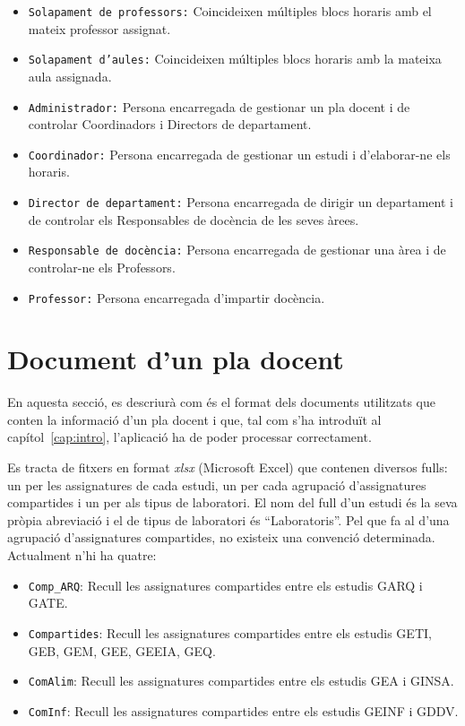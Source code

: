 \documentclass[a4paper,12pt]{ThesisStyle}
\begin{document}
\begin{itemize}
  \item \texttt{Solapament de professors:} Coincideixen múltiples blocs horaris amb el mateix professor assignat.
  \item \texttt{Solapament d'aules:} Coincideixen múltiples blocs horaris amb la mateixa aula assignada.
  \item \texttt{Administrador:} Persona encarregada de gestionar un pla docent i de controlar Coordinadors i Directors de departament.
  \item \texttt{Coordinador:} Persona encarregada de gestionar un estudi i d'elaborar-ne els horaris.
  \item \texttt{Director de departament:} Persona encarregada de dirigir un departament i de controlar els Responsables de docència de les seves àrees.
  \item \texttt{Responsable de docència:} Persona encarregada de gestionar una àrea i de controlar-ne els Professors.
  \item \texttt{Professor:} Persona encarregada d'impartir docència.
\end{itemize}

\section{Document d'un pla docent}
\label{sec:document_pla_docent}

En aquesta secció, es descriurà com és el format dels documents utilitzats que conten la informació d'un pla docent i que, tal com s'ha introduït al capítol~\ref{cap:intro}, l'aplicació ha de poder processar correctament.

Es tracta de fitxers en format \emph{xlsx} (Microsoft Excel) que contenen diversos fulls: un per les assignatures de cada estudi, un per cada agrupació d'assignatures compartides i un per als tipus de laboratori. El nom del full d'un estudi és la seva pròpia abreviació i el de tipus de laboratori és ``Laboratoris''. Pel que fa al d'una agrupació d'assignatures compartides, no existeix una convenció determinada. Actualment n'hi ha quatre:
\begin{itemize}
  \item \texttt{Comp\_ARQ}: Recull les assignatures compartides entre els estudis GARQ i GATE.
  \item \texttt{Compartides}: Recull les assignatures compartides entre els estudis GETI, GEB, GEM, GEE, GEEIA, GEQ.
  \item \texttt{ComAlim}: Recull les assignatures compartides entre els estudis GEA i GINSA.
  \item \texttt{ComInf}: Recull les assignatures compartides entre els estudis GEINF i GDDV.
\end{itemize}
\end{document}
